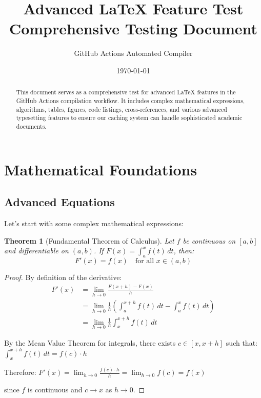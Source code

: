 \documentclass[12pt,a4paper,twoside]{article}
\title{\textbf{Advanced LaTeX Feature Test}\\
       \large Comprehensive Testing Document}
\author{GitHub Actions Automated Compiler}
\date{\today}
\newtheorem{theorem}{Theorem}[section]
\theoremstyle{definition}
\begin{document}
\maketitle

\begin{abstract}
This document serves as a comprehensive test for advanced LaTeX features in the GitHub Actions compilation workflow. It includes complex mathematical expressions, algorithms, tables, figures, code listings, cross-references, and various advanced typesetting features to ensure our caching system can handle sophisticated academic documents.
\end{abstract}

\tableofcontents
\newpage

\section{Mathematical Foundations}

\subsection{Advanced Equations}

Let's start with some complex mathematical expressions:

\begin{theorem}[Fundamental Theorem of Calculus]
Let $f$ be continuous on $[a,b]$ and differentiable on $(a,b)$. If $F(x) = \int_a^x f(t) \, dt$, then:
\begin{equation}
F'(x) = f(x) \quad \text{for all } x \in (a,b)
\end{equation}
\end{theorem}

\begin{proof}
By definition of the derivative:
\begin{align}
F'(x) &= \lim_{h \to 0} \frac{F(x+h) - F(x)}{h}\\
&= \lim_{h \to 0} \frac{1}{h} \left( \int_a^{x+h} f(t) \, dt - \int_a^x f(t) \, dt \right)\\
&= \lim_{h \to 0} \frac{1}{h} \int_x^{x+h} f(t) \, dt
\end{align}

By the Mean Value Theorem for integrals, there exists $c \in [x, x+h]$ such that:
$\int_x^{x+h} f(t) \, dt = f(c) \cdot h$

Therefore:
$F'(x) = \lim_{h \to 0} \frac{f(c) \cdot h}{h} = \lim_{h \to 0} f(c) = f(x)$

since $f$ is continuous and $c \to x$ as $h \to 0$.
\end{proof}
\end{document}
